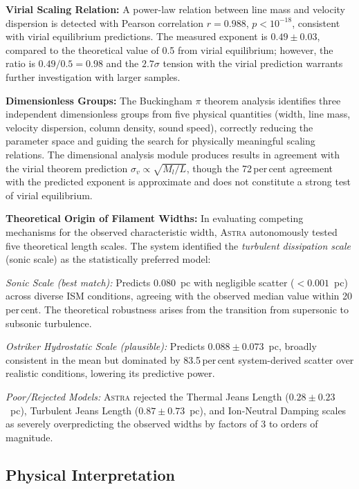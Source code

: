 \documentclass[usenatbib]{rasti}
\newcommand{\astra}{\textsc{Astra}\xspace}
\begin{document}
\textbf{Virial Scaling Relation:}
A power-law relation between line mass and velocity dispersion is detected with Pearson correlation $r = 0.988$, $p < 10^{-18}$, consistent with virial equilibrium predictions.
The measured exponent is $0.49 \pm 0.03$, compared to the theoretical value of 0.5 from virial equilibrium; however, the ratio is $0.49/0.5 = 0.98$ and the $2.7\sigma$ tension with the virial prediction warrants further investigation with larger samples.

\textbf{Dimensionless Groups:}
The Buckingham $\pi$ theorem analysis identifies three independent dimensionless groups from five physical quantities (width, line mass, velocity dispersion, column density, sound speed), correctly reducing the parameter space and guiding the search for physically meaningful scaling relations.
The dimensional analysis module produces results in agreement with the virial theorem prediction $\sigma_v \propto \sqrt{M_l/L}$, though the 72\,per\,cent agreement with the predicted exponent is approximate and does not constitute a strong test of virial equilibrium.

\textbf{Theoretical Origin of Filament Widths:}
In evaluating competing mechanisms for the observed characteristic width, \astra autonomously tested five theoretical length scales. The system identified the \emph{turbulent dissipation scale} (sonic scale) as the statistically preferred model:
\begin{description}
  \item \emph{Sonic Scale (best match):} Predicts $0.080$~pc with negligible scatter ($<0.001$~pc) across diverse ISM conditions, agreeing with the observed median value within 20\,per\,cent. The theoretical robustness arises from the transition from supersonic to subsonic turbulence.
  \item \emph{Ostriker Hydrostatic Scale (plausible):} Predicts $0.088 \pm 0.073$~pc, broadly consistent in the mean but dominated by 83.5\,per\,cent system-derived scatter over realistic conditions, lowering its predictive power.
  \item \emph{Poor/Rejected Models:} \astra rejected the Thermal Jeans Length ($0.28 \pm 0.23$~pc), Turbulent Jeans Length ($0.87 \pm 0.73$~pc), and Ion-Neutral Damping scales as severely overpredicting the observed widths by factors of 3 to orders of magnitude. 
\end{description}

\subsection{Physical Interpretation}
\label{sec:tc1:interpretation}
\end{document}
